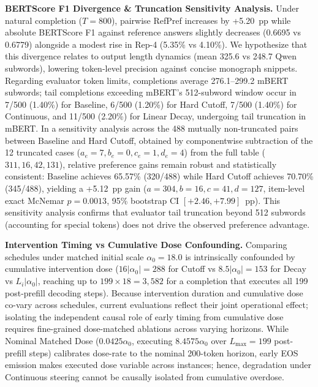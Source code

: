 \documentclass[runningheads]{llncs}
\begin{document}
\textbf{BERTScore F1 Divergence \& Truncation Sensitivity Analysis.} Under natural completion ($T=800$), pairwise RefPref increases by +5.20~pp while absolute BERTScore F1 against reference answers slightly decreases (0.6695 vs 0.6779) alongside a modest rise in Rep-4 (5.35\% vs 4.10\%). We hypothesize that this divergence relates to output length dynamics (mean 325.6 vs 248.7 Qwen subwords), lowering token-level precision against concise monograph snippets. Regarding evaluator token limits, completions average 276.1--299.2 mBERT subwords; tail completions exceeding mBERT's 512-subword window occur in 7/500 (1.40\%) for Baseline, 6/500 (1.20\%) for Hard Cutoff, 7/500 (1.40\%) for Continuous, and 11/500 (2.20\%) for Linear Decay, undergoing tail truncation in mBERT. In a sensitivity analysis across the 488 mutually non-truncated pairs between Baseline and Hard Cutoff, obtained by componentwise subtraction of the 12 truncated cases ($a_e=7, b_e=0, c_e=1, d_e=4$) from the full table ($311, 16, 42, 131$), relative preference gains remain robust and statistically consistent: Baseline achieves 65.57\% (320/488) while Hard Cutoff achieves 70.70\% (345/488), yielding a +5.12~pp gain ($a=304, b=16, c=41, d=127$, item-level exact McNemar $p=0.0013$, 95\% bootstrap CI $[+2.46, +7.99]$~pp). This sensitivity analysis confirms that evaluator tail truncation beyond 512 subwords (accounting for special tokens) does not drive the observed preference advantage.

\textbf{Intervention Timing vs Cumulative Dose Confounding.} Comparing schedules under matched initial scale $\alpha_0=18.0$ is intrinsically confounded by cumulative intervention dose ($16|\alpha_0|=288$ for Cutoff vs $8.5|\alpha_0|=153$ for Decay vs $L_i|\alpha_0|$, reaching up to $199 \times 18 = 3,582$ for a completion that executes all 199 post-prefill decoding steps). Because intervention duration and cumulative dose co-vary across schedules, current evaluations reflect their joint operational effect; isolating the independent causal role of early timing from cumulative dose requires fine-grained dose-matched ablations across varying horizons. While Nominal Matched Dose ($0.0425\alpha_0$, executing $8.4575\alpha_0$ over $L_{\text{max}}=199$ post-prefill steps) calibrates dose-rate to the nominal 200-token horizon, early EOS emission makes executed dose variable across instances; hence, degradation under Continuous steering cannot be causally isolated from cumulative overdose.
\end{document}
